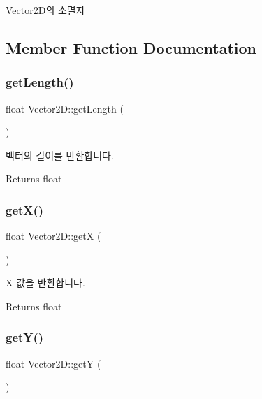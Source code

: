 Vector2\+D의 소멸자 

\subsection{Member Function Documentation}
\mbox{\label{class_vector2_d_a2fdc4c6d8ed4ca457381970736e9ab76}} 
\subsubsection{\texorpdfstring{getLength()}{getLength()}}
{\footnotesize\ttfamily float Vector2\+D\+::get\+Length (\begin{DoxyParamCaption}{ }\end{DoxyParamCaption})\hspace{0.3cm}{\ttfamily [inline]}}

벡터의 길이를 반환합니다. \begin{DoxyReturn}{Returns}
float 
\end{DoxyReturn}
\mbox{\label{class_vector2_d_a527601e47976bcfdac2520817bfee675}} 
\subsubsection{\texorpdfstring{getX()}{getX()}}
{\footnotesize\ttfamily float Vector2\+D\+::getX (\begin{DoxyParamCaption}{ }\end{DoxyParamCaption})\hspace{0.3cm}{\ttfamily [inline]}}

X 값을 반환합니다. \begin{DoxyReturn}{Returns}
float 
\end{DoxyReturn}
\mbox{\label{class_vector2_d_a5b797fb62a3c21ced0cc8e27afd62f8b}} 
\subsubsection{\texorpdfstring{getY()}{getY()}}
{\footnotesize\ttfamily float Vector2\+D\+::getY (\begin{DoxyParamCaption}{ }\end{DoxyParamCaption})\hspace{0.3cm}{\ttfamily [inline]}}


